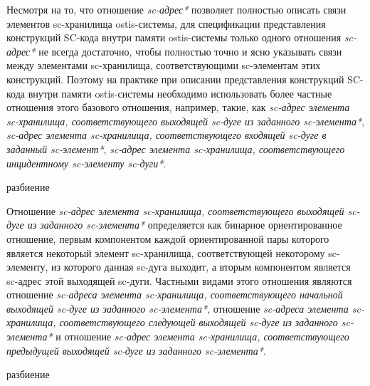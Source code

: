 Несмотря на то, что отношение \textit{sc-адрес*} позволяет полностью описать связи элементов sc-хранилища ostis-системы, для спецификации представления конструкций SC-кода внутри памяти ostis-системы только одного отношения \textit{sc-адрес*} не всегда достаточно, чтобы полностью точно и ясно указывать связи между элементами sc-хранилища, соответствующими sc-элементам этих конструкций. Поэтому на практике при описании представления конструкций SC-кода внутри памяти ostis-системы необходимо использовать более частные отношения этого базового отношения, например, такие, как \textit{sc-адрес элемента sc-хранилища, соответствующего выходящей sc-дуге из заданного sc-элемента*}, \textit{sc-адрес элемента sc-хранилища, соответствующего входящей sc-дуге в заданный sc-элемент*}, \textit{sc-адрес элемента sc-хранилища, соответствующего инцидентному sc-элементу sc-дуги*}.

\begin{SCn}
\begin{scnrelfromset}{разбиение}
\end{scnrelfromset}
\end{SCn}

Отношение \textit{sc-адрес элемента sc-хранилища, соответствующего выходящей sc-дуге из заданного sc-элемента*} определяется как бинарное ориентированное отношение, первым компонентом каждой ориентированной пары которого является некоторый элемент sc-хранилища, соответствующей некоторому sc-элементу, из которого данная sc-дуга выходит, а вторым компонентом является sc-адрес этой выходящей sc-дуги. Частными видами этого отношения являются отношение \textit{sc-адреса элемента sc-хранилища, соответствующего начальной выходящей sc-дуге из заданного sc-элемента*}, отношение \textit{sc-адреса элемента sc-хранилища, соответствующего следующей выходящей sc-дуге из заданного sc-элемента*} и отношение \textit{sc-адрес элемента sc-хранилища, соответствующего предыдущей выходящей sc-дуге из заданного sc-элемента*}.

\begin{SCn}
\begin{scnrelfromset}{разбиение}
\end{scnrelfromset}
\end{SCn}

